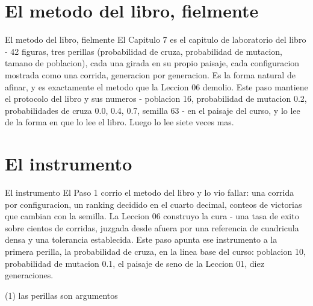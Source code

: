 \section{El metodo del libro, fielmente}

\begin{frame}{El metodo del libro, fielmente}
El Capitulo 7 es el capitulo de laboratorio del libro - 42 figuras, tres
perillas (probabilidad de cruza, probabilidad de mutacion, tamano de poblacion),
cada una girada en su propio paisaje, cada configuracion mostrada como una
corrida, generacion por generacion. Es la forma natural de afinar, y es
exactamente el metodo que la Leccion 06 demolio. Este paso mantiene el
protocolo del libro y sus numeros - poblacion 16, probabilidad de mutacion 0.2,
probabilidades de cruza 0.0, 0.4, 0.7, semilla 63 - en el paisaje del curso, y
lo lee de la forma en que lo lee el libro. Luego lo lee siete veces mas.
\end{frame}


\section{El instrumento}

\begin{frame}{El instrumento}
El Paso 1 corrio el metodo del libro y lo vio fallar: una corrida por configuracion, un
ranking decidido en el cuarto decimal, conteos de victorias que cambian con la semilla.
La Leccion 06 construyo la cura - una tasa de exito sobre cientos de corridas, juzgada desde
afuera por una referencia de cuadricula densa y una tolerancia establecida. Este paso apunta ese
instrumento a la primera perilla, la probabilidad de cruza, en la linea base
del curso: poblacion 10, probabilidad de mutacion 0.1, el paisaje de seno de la
Leccion 01, diez generaciones.
\end{frame}

\begin{frame}[fragile]{(1) las perillas son argumentos}

\end{frame}

